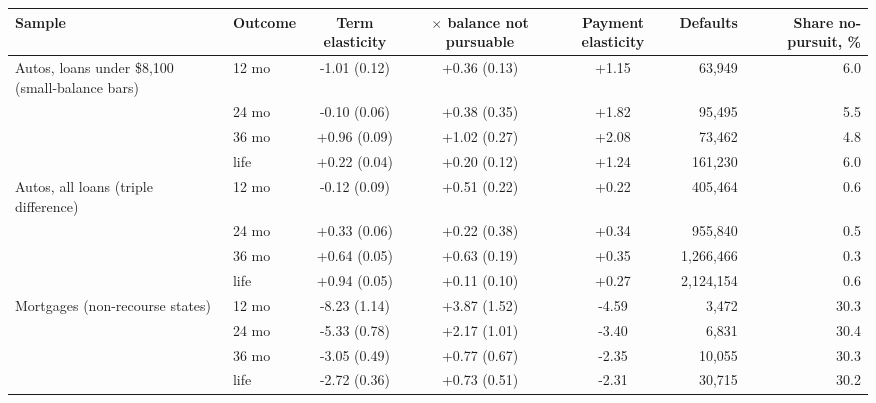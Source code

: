 \begin{tabular}{llcccrr}
\toprule
Sample & Outcome & Term elasticity & $\times$ balance not pursuable & Payment elasticity & Defaults & Share no-pursuit, \% \\
\midrule
Autos, loans under \$8,100 (small-balance bars) & 12 mo & -1.01 (0.12) & +0.36 (0.13) & +1.15 & 63,949 & 6.0 \\
 & 24 mo & -0.10 (0.06) & +0.38 (0.35) & +1.82 & 95,495 & 5.5 \\
 & 36 mo & +0.96 (0.09) & +1.02 (0.27) & +2.08 & 73,462 & 4.8 \\
 & life & +0.22 (0.04) & +0.20 (0.12) & +1.24 & 161,230 & 6.0 \\
Autos, all loans (triple difference) & 12 mo & -0.12 (0.09) & +0.51 (0.22) & +0.22 & 405,464 & 0.6 \\
 & 24 mo & +0.33 (0.06) & +0.22 (0.38) & +0.34 & 955,840 & 0.5 \\
 & 36 mo & +0.64 (0.05) & +0.63 (0.19) & +0.35 & 1,266,466 & 0.3 \\
 & life & +0.94 (0.05) & +0.11 (0.10) & +0.27 & 2,124,154 & 0.6 \\
Mortgages (non-recourse states) & 12 mo & -8.23 (1.14) & +3.87 (1.52) & -4.59 & 3,472 & 30.3 \\
 & 24 mo & -5.33 (0.78) & +2.17 (1.01) & -3.40 & 6,831 & 30.4 \\
 & 36 mo & -3.05 (0.49) & +0.77 (0.67) & -2.35 & 10,055 & 30.3 \\
 & life & -2.72 (0.36) & +0.73 (0.51) & -2.31 & 30,715 & 30.2 \\
\bottomrule
\end{tabular}
